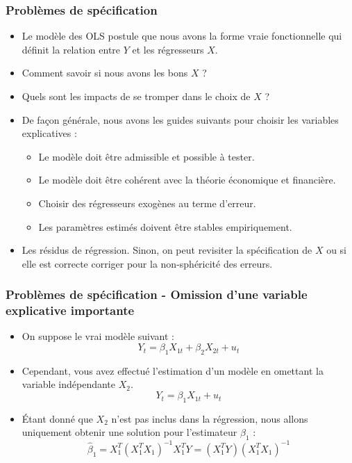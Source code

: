 \documentclass{beamer}
\begin{document}
\begin{frame}
\frametitle{Problèmes de spécification}
\begin{itemize}
    \item Le modèle des OLS postule que nous avons la forme vraie fonctionnelle qui définit la relation entre \( Y \) et les régresseurs \( X \).
    \item Comment savoir si nous avons les bons \( X \) ?
    \item Quels sont les impacts de se tromper dans le choix de \( X \) ?
    \item De façon générale, nous avons les guides suivants pour choisir les variables explicatives :
    \begin{itemize}
        \item Le modèle doit être admissible et possible à tester.
        \item Le modèle doit être cohérent avec la théorie économique et financière.
        \item Choisir des régresseurs exogènes au terme d’erreur.
        \item Les paramètres estimés doivent être stables empiriquement.
    \end{itemize}
    \item Les résidus de régression. Sinon, on peut revisiter la spécification de \( X \) ou si elle est correcte corriger pour la non-sphéricité des erreurs.
\end{itemize}
\end{frame}

\begin{frame}
\frametitle{Problèmes de spécification - Omission d’une variable explicative importante}
\begin{itemize}
    \item On suppose le vrai modèle suivant :
    \[
    Y_t = \beta_1 X_{1t} + \beta_2 X_{2t} + u_t
    \]
    \item Cependant, vous avez effectué l’estimation d’un modèle en omettant la variable indépendante \( X_2 \).
    \[
    Y_t = \beta_1 X_{1t} + u_t
    \]
    \item Étant donné que \( X_2 \) n’est pas inclus dans la régression, nous allons uniquement obtenir une solution pour l’estimateur \( \beta_1 \) :
    \[
    \hat{\beta}_1 = X_1^T \left( X_1^T X_1 \right)^{-1} X_1^T Y = \left( X_1^T Y \right) \left( X_1^T X_1 \right)^{-1}
    \]
\end{itemize}
\end{frame}
\end{document}
